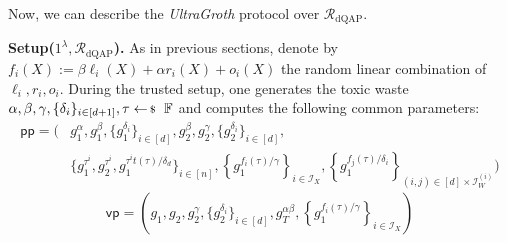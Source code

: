 \documentclass[../../book]{subfiles}
\begin{document}
Now, we can describe the \textit{UltraGroth} protocol over $\mathcal{R}_{\text{dQAP}}$.

\textbf{Setup($1^{\lambda},\mathcal{R}_{\text{dQAP}}$).} As in previous sections, denote by $f_i(X):= \beta \ell_i(X)+\alpha r_i(X)+o_i(X)$ the random linear combination of $\ell_i,r_i,o_i$. During the trusted setup, one generates the toxic waste $\alpha,\beta,\gamma,\{\delta_i\}_{i \in [d+1]},\tau \leftarrowS \mathbb{F}$ and computes the following common parameters:
\begin{align*}
\mathsf{pp} = \Big( &g_1^{\alpha},g_1^{\beta},\{g_1^{\delta_i}\}_{i \in [d]},g_2^{\beta}, g_2^{\gamma}, \{g_2^{\delta_i}\}_{i \in [d]}, \\
&\Big\{g_1^{\tau^i}, g_2^{\tau^i}, g_1^{\tau^it(\tau)/\delta_d}\Big\}_{i \in [n]}, \left\{g_1^{f_i(\tau)/\gamma}\right\}_{i \in \mathcal{I}_X}, \left\{g_1^{f_j(\tau)/\delta_i}\right\}_{(i,j) \in [d] \times \mathcal{I}_W^{(i)}}\Big)
\end{align*}
\[
\mathsf{vp} = \left( g_1,g_2, g_2^{\gamma}, \{g_2^{\delta_i}\}_{i \in [d]}, g_T^{\alpha\beta}, \left\{g_1^{f_i(\tau)/\gamma}\right\}_{i \in \mathcal{I}_{X}} \right)
\]
\end{document}
